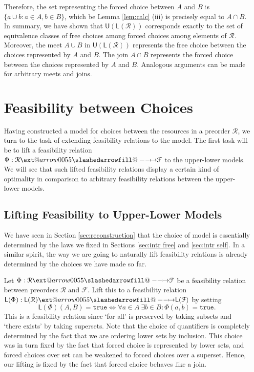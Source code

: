 \documentclass[12pt]{article}
\makeatletter
\theoremstyle{definition}
\theoremstyle{plain}
\theoremstyle{plain}
\theoremstyle{plain}
\theoremstyle{plain}
\theoremstyle{remark}
\theoremstyle{remark}
\newcommand{\mc}[1]{\mathcal{#1}}
\newcommand{\low}{\mathsf{L}}
\newcommand{\upper}{\mathsf{U}}
\newcommand{\true}{\mathtt{true}}
\def\slashedarrowfill@#1#2#3#4#5{%
	$\m@th\thickmuskip0mu\medmuskip\thickmuskip\thinmuskip\thickmuskip
	\relax#5#1\mkern-7mu%
	\cleaders\hbox{$#5\mkern-2mu#2\mkern-2mu$}\hfill
	\mathclap{#3}\mathclap{#2}%
	\cleaders\hbox{$#5\mkern-2mu#2\mkern-2mu$}\hfill
	\mkern-7mu#4$%
}
\def\rightslashedarrowfill@{%
	\slashedarrowfill@\relbar\relbar\mapstochar\rightarrow}
\newcommand\xslashedrightarrow[2][]{%
	\ext@arrow 0055{\rightslashedarrowfill@}{#1}{#2}}
\makeatother
\begin{document}
Therefore, the set representing the forced choice between $A$ and $B$ is $\{a \cup b: a\in A, b\in B\}$, which be Lemma \ref{lem:calc} (iii) is precisely equal to $A \cap B$. \\

In summary, we have shown that $\upper(\low(\mc{R}))$ corresponds exactly to the set of equivalence classes of free choices among forced choices among elements of $\mc{R}$. Moreover, the meet $A \cup B$ in $\upper(\low(\mc{R}))$ represents the free choice between the choices represented by $A$ and $B$. The join $A \cap B$ represents the forced choice between the choices represented by $A$ and $B$. Analogous arguments can be made for arbitrary meets and joins.

\section{Feasibility between Choices}
Having constructed a model for choices between the resources in a preorder $\mc{R}$, we turn to the task of extending feasibility relations to the model. The first task will be to lift a feasibility relation $\Phi: \mc{R} \xslashedrightarrow{} \mc{F}$ to the upper-lower models. We will see that such lifted feasibility relations display a certain kind of optimality in comparison to arbitrary feasibility relations between the upper-lower models.

\subsection{Lifting Feasibility to Upper-Lower Models}
We have seen in Section \ref{sec:reconstruction} that the choice of model is essentially determined by the laws we fixed in Sections \ref{sec:intr free} and \ref{sec:intr self}. In a similar spirit, the way we are going to naturally lift feasibility relations is already determined by the choices we have made so far.

Let $\Phi: \mc{R} \xslashedrightarrow{} \mc{F}$ be a feasibility relation between preorders $\mc{R}$ and $\mc{F}$. Lift this to a feasibility relation $\low(\Phi): \low(\mc{R}) \xslashedrightarrow{} \low(\mc{F})$ by setting 
$$\low(\Phi)(A,B) = \true \iff \forall a \in A \: \exists b \in B: \Phi(a,b)=\true.$$
This is a feasibility relation since `for all' is preserved by taking subsets and `there exists' by taking supersets. Note that the choice of quantifiers is completely determined by the fact that we are ordering lower sets by inclusion. This choice was in turn fixed by the fact that forced choice is represented by lower sets, and forced choices over set can be weakened to forced choices over a superset. Hence, our lifting is fixed by the fact that forced choice behaves like a join.
\end{document}
